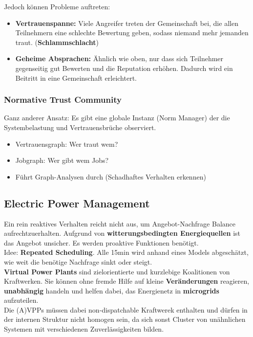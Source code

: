 \documentclass[a4paper]{article}
\begin{document}
Jedoch können Probleme auftreten:
\begin{itemize}
	\item \textbf{Vertrauenspanne:} Viele Angreifer treten der Gemeinschaft bei, die allen Teilnehmern eine schlechte Bewertung geben, sodass niemand mehr jemanden traut. (\textbf{Schlammschlacht})
	\item \textbf{Geheime Absprachen:} Ähnlich wie oben, nur dass sich Teilnehmer gegenseitig gut Bewerten und die Reputation erhöhen. Dadurch wird ein Beitritt in eine Gemeinschaft erleichtert.
\end{itemize}
\subsubsection{Normative Trust Community}
Ganz anderer Ansatz: Es gibt eine globale Instanz (Norm Manager) der die Systembelastung und Vertrauensbrüche observiert.
\begin{itemize}
	\item Vertrauensgraph: Wer traut wem?
	\item Jobgraph: Wer gibt wem Jobs?
	\item Führt Graph-Analysen durch (Schadhaftes Verhalten erkennen)
\end{itemize}
\subsection{Electric Power Management}
Ein rein reaktives Verhalten reicht nicht aus, um Angebot-Nachfrage Balance aufrechtzuerhalten. Aufgrund von \textbf{witterungsbedingten Energiequellen} ist das Angebot unsicher. Es werden proaktive Funktionen benötigt.\\

Idee: \textbf{Repeated Scheduling}. Alle 15min wird anhand eines Models abgeschätzt, wie weit die benötige Nachfrage sinkt oder steigt.\\

\textbf{Virtual Power Plants} sind zielorientierte und kurzlebige Koalitionen von Kraftwerken. Sie können ohne fremde Hilfe auf kleine \textbf{Veränderungen} reagieren, \textbf{unabhängig} handeln und helfen dabei, das Energienetz in \textbf{microgrids} aufzuteilen.\\

Die (A)VPPs müssen dabei non-dispatchable Kraftwerek enthalten und dürfen in der internen Struktur nicht homogen sein, da sich sonst Cluster von unähnlichen Systemen mit verschiedenen Zuverlässigkeiten bilden.
\end{document}
